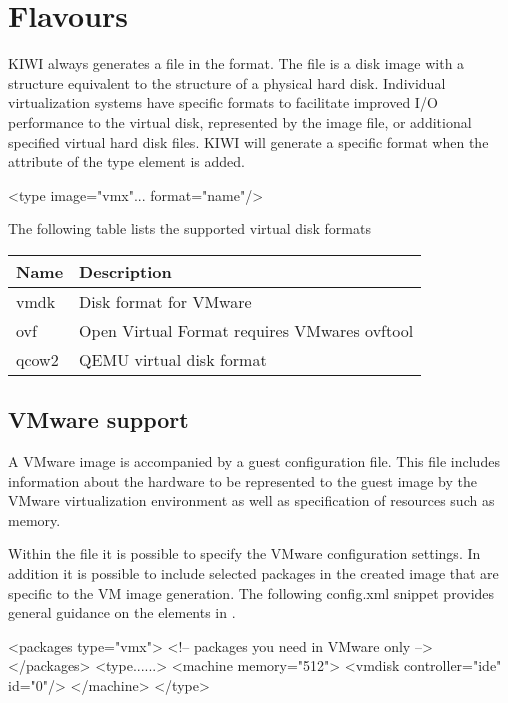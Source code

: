 \section{Flavours}

KIWI always generates a file in the  format. The  file is a disk
image with a structure equivalent to the structure of a physical hard disk. 
Individual virtualization systems have specific formats to facilitate
improved I/O performance to the virtual disk, represented by the image file,
or additional specified virtual hard disk files. KIWI will generate a 
specific format when the  attribute of the type element is added.


\begin{xml}
<type image="vmx"... format="name"/>
\end{xml}

The following table lists the supported virtual disk formats

\begin{tabular}[h]{|p{2cm}|p{9cm}|}
\hline
\textbf{Name} & \textbf{Description} \\
\hline
vmdk\index{vmdk}\index{VMware!vmdk}       & Disk format for VMware \\
ovf\index{ovf}         & Open Virtual Format requires VMwares ovftool \\
qcow2\index{qcow2}     & QEMU virtual disk format  \\
\hline
\end{tabular}

\subsection{VMware support}
A VMware image is accompanied by a guest configuration file. This file 
includes information about the hardware to be represented to the guest 
image by the VMware virtualization environment as well as specification
of resources such as memory. 

Within the 
file it is possible to specify the VMware configuration
settings. In addition it is possible to include selected packages in the 
created image that are specific to the VM image generation. The following
config.xml snippet provides general guidance on the elements in .

\begin{xml}
<packages type="vmx">
   <!-- packages you need in VMware only -->
</packages>
<type......>
   <machine memory="512">
      <vmdisk controller="ide" id="0"/>
   </machine>
</type>
\end{xml}

